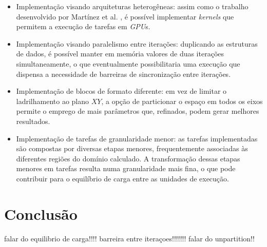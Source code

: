 \documentclass[cic,tc]{iiufrgs}
\begin{document}
\begin{itemize}
\item{Implementação visando arquiteturas heterogêneas:} assim como o trabalho desenvolvido por Martínez et al. \cite{victor}, é possível implementar \textit{kernels}
  que permitem a execução de tarefas em \textit{GPU}s.
\item{Implementação visando paralelismo entre iterações:} duplicando as estruturas de dados, é possível manter em memória valores de duas iterações simultaneamente, o que
  eventualmente possibilitaria uma execução que dispensa a necessidade de barreiras de sincronização entre iterações.
\item{Implementação de blocos de formato diferente:} em vez de limitar o ladrilhamento ao plano $XY$, a opção de particionar o espaço em todos os eixos permite o
  emprego de mais parâmetros que, refinados, podem gerar melhores resultados.
\item{Implementação de tarefas de granularidade menor:} as tarefas implementadas são compostas por diversas etapas menores, frequentemente associadas às diferentes
  regiões do domínio calculado. A transformação dessas etapas menores em tarefas resulta numa granularidade mais fina, o que pode contribuir para o equilíbrio de carga
  entre as unidades de execução.
\end{itemize}



\chapter{Conclusão}
falar do equilibrio de carga!!!!
barreira entre iteraçoes!!!!!!!
falar do unpartition!!
% 

% 



\end{document}
